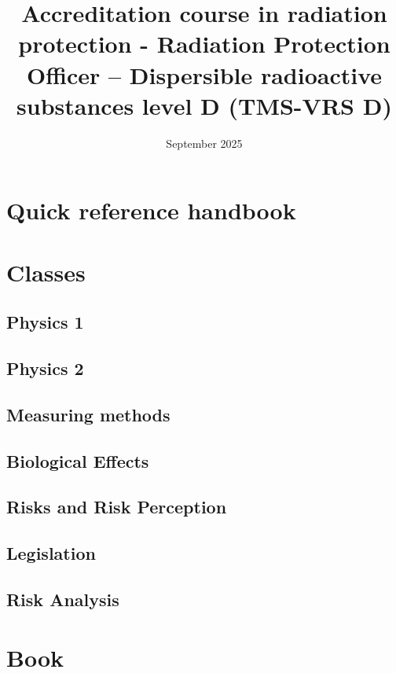\documentclass{report}
\title{Accreditation course in radiation protection - Radiation Protection Officer – Dispersible radioactive substances level D (TMS-VRS D)}
\date{September 2025}
\begin{document}
\maketitle
\tableofcontents
\part{Quick reference handbook}
\part{Classes}
\chapter{Physics 1}
\chapter{Physics 2}
\chapter{Measuring methods}
\chapter{Biological Effects}
\chapter{Risks and Risk Perception}
\chapter{Legislation}
\chapter{Risk Analysis}
\part{Book}
\end{document}
